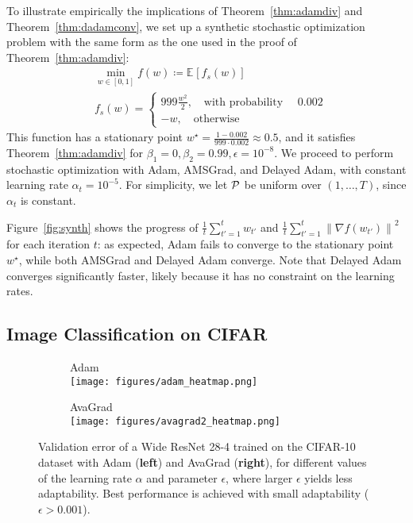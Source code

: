 \documentclass{article}
\newcommand{\thmref}[1]{Theorem~\ref{#1}}
\newcommand{\w}{w}
\newcommand{\fs}{f_s}
\newcommand{\curra}{\alpha_t}
\newcommand{\normed}[1]{\left\lVert {#1} \right\rVert}
\newcommand{\btwo}{\beta_2}
\newcommand{\bone}{\beta_1}
\newcommand{\expec}[2]{\mathbb E_{#1} \left[ {#2} \right]}
\begin{document}
To illustrate empirically the implications of \thmref{thm:adamdiv} and
\thmref{thm:dadamconv}, we set up a synthetic stochastic optimization problem
with the same form as the one used in the proof of \thmref{thm:adamdiv}:
\begin{equation}
\begin{split}
   & \min_{\w \in [0, 1]} f(\w) \coloneqq \expec{}{\fs(\w)} \\
   & \fs(\w) =
   \begin{cases}
      999 \frac{\w^2}2, \quad \text{with probability } \quad 0.002\\
      -\w, \quad \text{otherwise}
   \end{cases}
   \label{eq:synth}
\end{split}
\end{equation}
This function has a stationary point
$\w^\star = \frac{1-0.002}{999 \cdot 0.002} \approx 0.5$, and it satisfies
\thmref{thm:adamdiv} for $\bone = 0, \btwo = 0.99, \epsilon=10^{-8}$.
We proceed to perform stochastic optimization with Adam, AMSGrad, and Delayed
Adam, with constant learning rate $\curra = 10^{-5}$.  For simplicity, we let
$\cal P$ be uniform over $(1, \dots, T)$, since $\curra$ is constant.

Figure~\ref{fig:synth} shows the progress of $\frac1t \sum_{t'=1}^t \w_{t'}$
and $\frac1t \sum_{t'=1}^t \normed{\nabla f(\w_{t'})}^2$ for each iteration
$t$: as expected, Adam fails to converge to the stationary point $\w^\star$,
while both AMSGrad and Delayed Adam converge.  Note that Delayed Adam converges
significantly faster, likely because it has no constraint on the learning
rates.

\subsection{Image Classification on CIFAR}
\label{sec:cifar}
\begin{figure*}[bt!]
   \centering
   \begin{subfigure}{.5\textwidth}
      \centering
      \scriptsize{\textsf{Adam}}\\
      \texttt{[image: figures/adam\_heatmap.png]}
   \end{subfigure}\hfill
   \begin{subfigure}{.5\textwidth}
      \centering
      \scriptsize{\textsf{AvaGrad}}\\
      \texttt{[image: figures/avagrad2\_heatmap.png]}
   \end{subfigure}
   \caption{
      Validation error of a Wide ResNet 28-4 trained on the CIFAR-10
      dataset with Adam (\textbf{left}) and AvaGrad (\textbf{right}), for different values of the learning rate $\alpha$ and
      parameter $\epsilon$, where larger $\epsilon$ yields less
      adaptability. Best performance is achieved with small adaptability ($\epsilon > 0.001$).
   }
   \label{fig:cnns}
\end{figure*}
 
\end{document}
